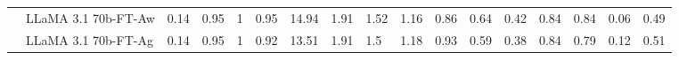\begin{table*}[t]
{\begin{tabular}{@{}ll|llll|llll|lll|ll|ll@{}}
                           & LLaMA 3.1 70b-FT-Aw  & 0.14                                                                    & 0.95                                                                     & 1                                                                     & 0.95                                                                  & 14.94                                                                   & 1.91                                                                  & 1.52                                                                  & 1.16                                                                   & 0.86                                                                    & 0.64                                                                  & 0.42                                                                   & 0.84                                                                   & 0.84                                                                   & 0.06                                                                     & 0.49                                                                     \\
                           & LLaMA 3.1 70b-FT-Ag  & 0.14                                                                    & 0.95                                                                     & 1                                                                     & 0.92                                                                  & 13.51                                                                   & 1.91                                                                  & 1.5                                                                   & 1.18                                                                   & 0.93                                                                    & 0.59                                                                  & 0.38                                                                   & 0.84                                                                   & 0.79                                                                   & 0.12                                                                     & 0.51                                                                     \\

\end{tabular}}
\end{table*}
